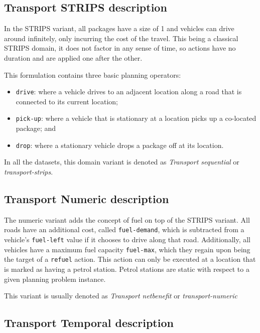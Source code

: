 \subsection{Transport STRIPS description}\label{transport-strips}

In the STRIPS variant, all packages have a size of 1 and vehicles can drive around infinitely,
only incurring the cost of the travel. This being a classical STRIPS domain, it does not factor in any sense
of time, so actions have no duration and are applied one after the other.

This formulation contains three basic planning operators:

\begin{itemize}
\item \verb+drive+:  where a vehicle drives to an adjacent location
along a road that is connected to its current location;
\item \verb+pick-up+:  where a vehicle that is stationary at a location picks up a co-located package; and
\item \verb+drop+: where a stationary vehicle drops a package off at its location.
\end{itemize}

In all the datasets, this domain variant is denoted as \textit{Transport sequential}
or \textit{transport-strips}.

\subsection{Transport Numeric description}\label{transport-numeric}

The numeric variant adds the concept of fuel on top of the STRIPS variant.
All roads have an additional cost, called \verb+fuel-demand+, which is
subtracted from a vehicle's \verb+fuel-left+ value if it chooses to drive along that road.
Additionally, all vehicles have a maximum fuel capacity \verb+fuel-max+,
which they regain upon being the target of a \verb+refuel+ action. This action can only
be executed at a location that is marked as having a petrol station. Petrol stations
are static with respect to a given planning problem instance.

This variant is usually denoted as \textit{Transport netbenefit} or \textit{transport-numeric}


\subsection{Transport Temporal description}\label{transport-temporal}

